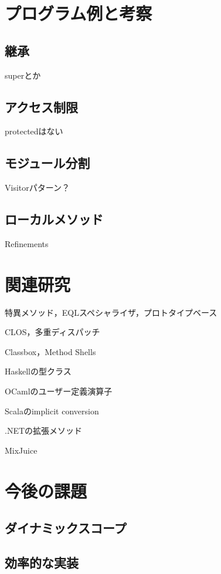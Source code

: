 \documentclass[a4paper,11pt,dvipdfmx]{jreport}
\begin{document}
\chapter{プログラム例と考察}
\label{chapter:discussion}

\section{継承}
superとか

\section{アクセス制限}
protectedはない

\section{モジュール分割}
Visitorパターン？

\section{ローカルメソッド}
Refinements

\chapter{関連研究}
\label{chapter:related-work}

特異メソッド，EQLスペシャライザ，プロトタイプベース

CLOS，多重ディスパッチ

Classbox，Method Shells

Haskellの型クラス

OCamlのユーザー定義演算子

Scalaのimplicit conversion

.NETの拡張メソッド

MixJuice


\chapter{今後の課題}
\label{chapter:future-work}

\section{ダイナミックスコープ}

\section{効率的な実装}
\end{document}

